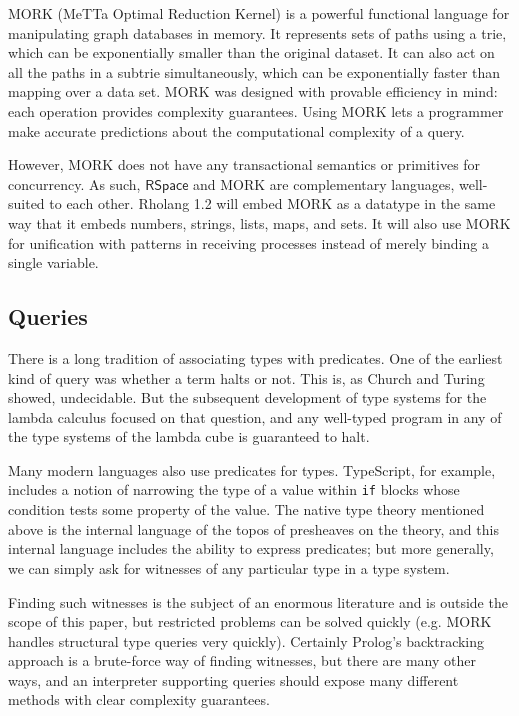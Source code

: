 \documentclass{article}
\newcommand{\RS}{\mathsf{RSpace}}
\begin{document}
MORK (MeTTa Optimal Reduction Kernel) is a powerful functional language for manipulating graph databases in memory. It represents sets of paths using a trie, which can be exponentially smaller than the original dataset.  It can also act on all the paths in a subtrie simultaneously, which can be exponentially faster than mapping over a data set.  MORK was designed with provable efficiency in mind: each operation provides complexity guarantees.  Using MORK lets a programmer make accurate predictions about the computational complexity of a query.

However, MORK does not have any transactional semantics or primitives for concurrency.  As such, $\RS$ and MORK are complementary languages, well-suited to each other.  Rholang 1.2 will embed MORK as a datatype in the same way that it embeds numbers, strings, lists, maps, and sets.  It will also use MORK for unification with patterns in receiving processes instead of merely binding a single variable.

\subsection{Queries}
\label{Queries}

There is a long tradition of associating types with predicates.  One of the earliest kind of query was whether a term halts or not.  This is, as Church and Turing showed, undecidable.  But the subsequent development of type systems for the lambda calculus focused on that question, and any well-typed program in any of the type systems of the lambda cube is guaranteed to halt.

Many modern languages also use predicates for types.  TypeScript, for example, includes a notion of narrowing the type of a value within \verb+if+ blocks whose condition tests some property of the value.  The native type theory mentioned above is the internal language of the topos of presheaves on the theory, and this internal language includes the ability to express predicates; but more generally, we can simply ask for witnesses of any particular type in a type system.  

Finding such witnesses is the subject of an enormous literature and is outside the scope of this paper, but restricted problems can be solved quickly (e.g. MORK handles structural type queries very quickly).  Certainly Prolog's backtracking approach is a brute-force way of finding witnesses, but there are many other ways, and an interpreter supporting queries should expose many different methods with clear complexity guarantees.
\end{document}
